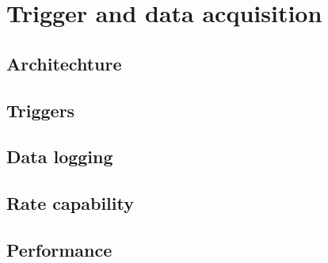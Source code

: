 
\section{Trigger and data acquisition  \label{sec:trigdaq}}
\subsection{Architechture \label{sec:trigdaqarchichecture}}
\subsection{Triggers \label{sec:trigdaqtriggers}}
\subsection{Data logging \label{sec:trigdaqdata}}
\subsection{Rate capability \label{sec:trigdaqrate}}
\subsection{Performance \label{sec:trigdaqperformance}}
